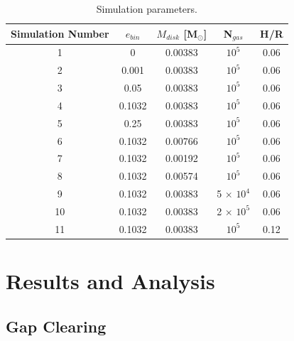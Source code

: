 \begin{table}
	\centering
	\caption{Simulation parameters.}
	\begin{tabular}{ccccc} %
		\hline
		Simulation Number & $e_{bin}$ & $M_{disk}$ [M$_{\odot}$] & N$_{gas}$ & H/R \\
		\hline
		1 & 0 & 0.00383 & $10^5$ & 0.06 \\
		2 & 0.001 & 0.00383 & $10^5$ & 0.06 \\
		3 & 0.05 & 0.00383 & $10^5$ & 0.06 \\
		4 & 0.1032 & 0.00383 & $10^5$ & 0.06 \\
		5 & 0.25 & 0.00383 & $10^5$ & 0.06 \\ 
		6 & 0.1032 & 0.00766 & $10^5$ & 0.06 \\
		7 & 0.1032 & 0.00192 & $10^5$ & 0.06 \\
		8 & 0.1032 & 0.00574 & $10^5$ & 0.06 \\
		9 & 0.1032 & 0.00383 & 5 $\times$ $10^4$ & 0.06 \\
		10 & 0.1032 & 0.00383 & 2 $\times$ $10^5$ & 0.06 \\
		11 & 0.1032 & 0.00383 & $10^5$ & 0.12 \\
		\hline
	\end{tabular}
	\label{tab:CBDisk_table_2}
\end{table}

\section{Results and Analysis}


\subsection{Gap Clearing} \label{CBDisk:sec:GapClearing}

